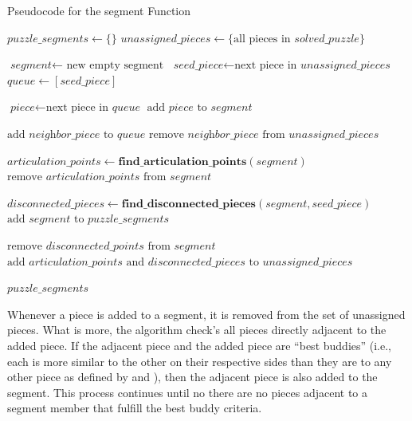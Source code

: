 \begin{algorithm}
\caption{Pseudocode for the segment Function}\label{alg:segmentPuzzle}
\begin{algorithmic}[1]
    \State $\textit{puzzle\_segments} \gets \{ \}$
    \State $\textit{unassigned\_pieces} \gets \{ \text{all pieces in } \textit{solved\_puzzle} \}$
\item[]
        \State $\textit{segment} \gets \text{ new empty segment}$
        \State $\textit{seed\_piece} \gets \text{next piece in } \textit{unassigned\_pieces}$
        \State $\textit{queue} \gets [\textit{seed\_piece}]$
\item[]
            \State $\textit{piece} \gets \text{next piece in }\textit{queue}$
            \State $\text{add } \textit{piece} \text{ to } \textit{segment}$
\item[]
            		\State $\text{add } \textit{neighbor\_piece} \text{ to } \textit{queue}$
            		\State $\text{remove } \textit{neighbor\_piece} \text{ from } \textit{unassigned\_pieces}$
            	\EndIf
            \EndFor
        \EndWhile
\item[]
        \State $\textit{articulation\_points} \gets \textbf{find\_articulation\_points}(\textit{segment})$
        \State $\text{remove } \textit{articulation\_points} \text{ from } \textit{segment}$
\item[]
		\State $\textit{disconnected\_pieces} \gets \textbf{find\_disconnected\_pieces}(\textit{segment},\textit{seed\_piece})$        
        \State $\text{add } \textit{segment} \text{ to } \textit{puzzle\_segments}$
\item[]
		\State $\text{remove } \textit{disconnected\_points} \text{ from } \textit{segment}$
        \State $\text{add } \textit{articulation\_points} \text{ and } \textit{disconnected\_pieces} \text{ to } \textit{unassigned\_pieces}$
    \EndWhile
\item[]
    \State \Return $\textit{puzzle\_segments}$
\EndFunction
\end{algorithmic}
\end{algorithm}

Whenever a piece is added to a segment, it is removed from the set of unassigned pieces. What is more, the algorithm check's all pieces directly adjacent to the added piece.  If the adjacent piece and the added piece are ``best buddies'' (i.e., each is more similar to the other on their respective sides than they are to any other piece as defined by \cite{pomeranz2011} and \cite{paikin2015}), then the adjacent piece is also added to the segment.  This process continues until no there are no pieces adjacent to a segment member that fulfill the best buddy criteria.

